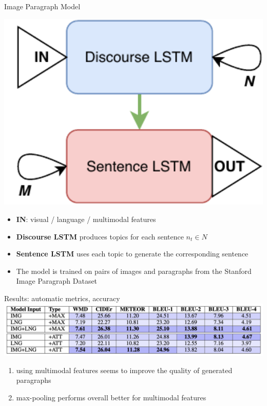 \documentclass[notes=hide]{beamer}
\begin{document}
\begin{frame}{Image Paragraph Model}
\small
\begin{minipage}{.45\textwidth}
\vspace{.3cm}
\includegraphics[width=1\textwidth]{models.pdf}
\end{minipage}\hfill
\begin{minipage}{.5\textwidth}
\begin{itemize}
\item \textbf{IN}: visual / language / multimodal features
\pause
\item \textbf{Discourse LSTM} produces topics for each sentence $n_t \in N$ 
\item \textbf{Sentence LSTM} uses each topic to generate the corresponding sentence
\pause
\item The model is trained on pairs of images and paragraphs from the Stanford Image Paragraph Dataset
\end{itemize}
\end{minipage} %
\end{frame}

\begin{frame}{Results: automatic metrics, accuracy}
\small
\includegraphics[width=1\textwidth]{res1.png}
\begin{enumerate}
\item using multimodal features seems to improve the quality of generated paragraphs
\pause
\item max-pooling performs overall better for multimodal features
\end{enumerate}
\end{frame}
\end{document}
